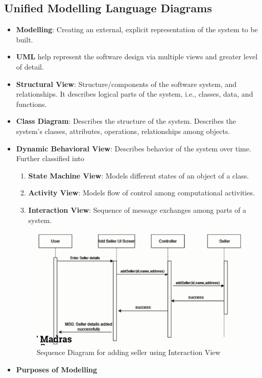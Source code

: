 \documentclass[a4paper]{article}
\begin{document}
\subsection{Unified Modelling Language Diagrams}
\begin{itemize}
    \item \textbf{Modelling}: Creating an external, explicit representation of the system to be built.
    \item \textbf{UML} help represent the software design via multiple views and greater level of detail.
    \item \textbf{Structural View}: Structure/components of the software system, and relationships. It describes logical parts of the system, i.e., classes, data, and functions.
    \item \textbf{Class Diagram}: Describes the structure of the system. Describes the system's classes, attributes, operations, relationships among objects.
    \item \textbf{Dynamic Behavioral View}: Describes behavior of the system over time. Further classified into
    \begin{enumerate}
        \item \textbf{State Machine View}: Models different states of an object of a class.
        \item \textbf{Activity View}: Models flow of control among computational activities.
        \item \textbf{Interaction View}: Sequence of message exchanges among parts of a system.
    \end{enumerate}
    \begin{figure}[H]
        \centering
        \includegraphics[width=0.8\linewidth]{Degree//static/SE_sequence_diagram.png}
        \caption{Sequence Diagram for adding seller using Interaction View}
    \end{figure}
    \item \textbf{Purposes of Modelling}

\end{itemize}
\end{document}
